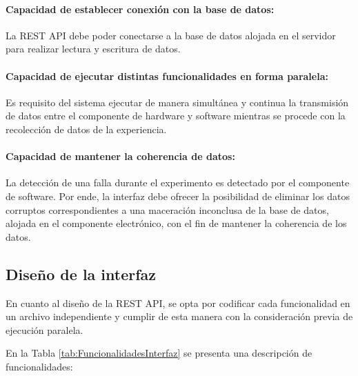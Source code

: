             \paragraph{Capacidad de establecer conexión con la base de datos:} 
                \par La REST API debe poder conectarse a la base de datos alojada en el servidor para realizar lectura y escritura de datos.
       
            \paragraph{Capacidad de ejecutar distintas funcionalidades en forma paralela:}
                \par Es requisito del sistema ejecutar de manera simultánea y continua la transmisión de datos entre el componente de hardware y software mientras se procede con la recolección de datos de la experiencia.
            
            \paragraph{Capacidad de mantener la coherencia de datos:}
                \par La detección de una falla durante el experimento es detectado por el componente de software. Por ende, la interfaz debe ofrecer la posibilidad de eliminar los datos corruptos correspondientes a una maceración inconclusa de la base de datos, alojada en el componente electrónico, con el fin de mantener la coherencia de los datos.
            
        
        
        \subsection{Diseño de la interfaz}
            \par En cuanto al diseño de la REST API, se opta por codificar cada funcionalidad en un archivo independiente y cumplir de esta manera con la consideración previa de ejecución paralela.
            \par En la Tabla \ref{tab:FuncionalidadesInterfaz} se presenta una descripción de funcionalidades:
            
            
            
